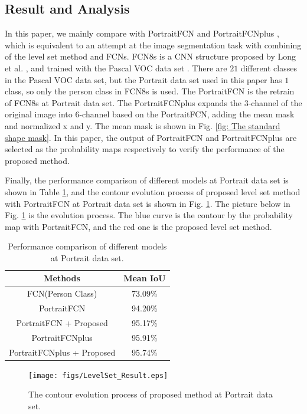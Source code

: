\subsection{Result and Analysis}\label{subsec: Result and Analysis}
In this paper, we mainly compare with PortraitFCN and PortraitFCNplus \cite{FCN:segmentation:shen2016automatic}, which is equivalent to an attempt at the image segmentation task with combining of the level set method and FCNs. FCN8s is a CNN structure proposed by Long et al. \cite{FCN-original:long2015fully}, and trained with the Pascal VOC data set \cite{FCN:DataSet:Everingham15}. There are $21$ different classes in the Pascal VOC data set, but the Portrait data set used in this paper has $1$ class, so only the person class in FCN8s is used. The PortraitFCN is the retrain of FCN8s at Portrait data set. The PortraitFCNplus expands the $3$-channel of the original image into $6$-channel based on the PortraitFCN, adding the mean mask and normalized x and y. The mean mask is shown in Fig. \ref{fig: The standard shape mask}. In this paper, the output of PortraitFCN and PortraitFCNplus are selected as the probability maps respectively to verify the performance of the proposed method.

Finally, the performance comparison of different models at Portrait data set is shown in Table \ref{table: Performance comparson of different models}, and the contour evolution process of proposed level set method with PortraitFCN at Portrait data set is shown in Fig. \ref{fig: The contour evolution process of proposed Level Set method at Portrait data set}. The picture below in Fig. \ref{fig: The contour evolution process of proposed Level Set method at Portrait data set} is the evolution process. The blue curve is the contour by the probability map with PortraitFCN, and the red one is the proposed level set method.
\begin{table}[h]
    \centering
    \caption{Performance comparison of different models at Portrait data set.}\label{table: Performance comparson of different models}
    \begin{tabular}{c|c}
        \hline
        \hline
        \textbf{Methods} & \textbf{Mean IoU} \\
        \hline
        FCN(Person Class) & 73.09\% \\
        PortraitFCN & 94.20\% \\
        PortraitFCN + Proposed & 95.17\% \\
        PortraitFCNplus & 95.91\% \\
        PortraitFCNplus + Proposed & 95.74\% \\
        \hline
        \hline
    \end{tabular}
\end{table}
\begin{figure}[ht]
    \centering
    \texttt{[image: figs/LevelSet\_Result.eps]}
    \caption{The contour evolution process of proposed method at Portrait data set.}
    \label{fig: The contour evolution process of proposed Level Set method at Portrait data set}
\end{figure}

